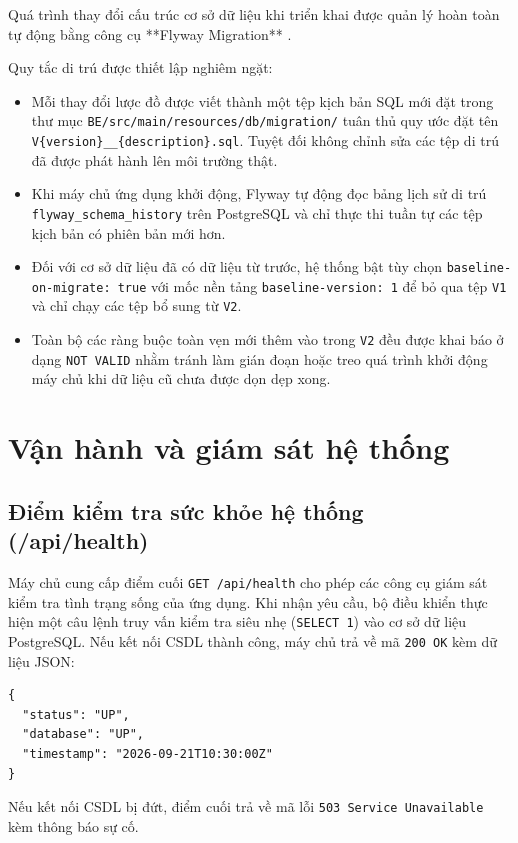 Quá trình thay đổi cấu trúc cơ sở dữ liệu khi triển khai được quản lý hoàn toàn tự động bằng công cụ **Flyway Migration** \cite{flyway_docs}. 

Quy tắc di trú được thiết lập nghiêm ngặt:
\begin{itemize}
    \item Mỗi thay đổi lược đồ được viết thành một tệp kịch bản SQL mới đặt trong thư mục \texttt{BE/src/main/resources/db/migration/} tuân thủ quy ước đặt tên \texttt{V\{version\}\_\_\{description\}.sql}. Tuyệt đối không chỉnh sửa các tệp di trú đã được phát hành lên môi trường thật.
    \item Khi máy chủ ứng dụng khởi động, Flyway tự động đọc bảng lịch sử di trú \texttt{flyway\_schema\_history} trên PostgreSQL và chỉ thực thi tuần tự các tệp kịch bản có phiên bản mới hơn.
    \item Đối với cơ sở dữ liệu đã có dữ liệu từ trước, hệ thống bật tùy chọn \texttt{baseline-on-migrate: true} với mốc nền tảng \texttt{baseline-version: 1} để bỏ qua tệp \texttt{V1} và chỉ chạy các tệp bổ sung từ \texttt{V2}.
    \item Toàn bộ các ràng buộc toàn vẹn mới thêm vào trong \texttt{V2} đều được khai báo ở dạng \texttt{NOT VALID} nhằm tránh làm gián đoạn hoặc treo quá trình khởi động máy chủ khi dữ liệu cũ chưa được dọn dẹp xong.
\end{itemize}

\section{Vận hành và giám sát hệ thống}
\label{sec:tk_vanhanh}

\subsection{Điểm kiểm tra sức khỏe hệ thống (/api/health)}
Máy chủ cung cấp điểm cuối \texttt{GET /api/health} cho phép các công cụ giám sát kiểm tra tình trạng sống của ứng dụng. Khi nhận yêu cầu, bộ điều khiển thực hiện một câu lệnh truy vấn kiểm tra siêu nhẹ (\texttt{SELECT 1}) vào cơ sở dữ liệu PostgreSQL. Nếu kết nối CSDL thành công, máy chủ trả về mã \texttt{200 OK} kèm dữ liệu JSON:
\begin{lstlisting}
{
  "status": "UP",
  "database": "UP",
  "timestamp": "2026-09-21T10:30:00Z"
}
\end{lstlisting}
Nếu kết nối CSDL bị đứt, điểm cuối trả về mã lỗi \texttt{503 Service Unavailable} kèm thông báo sự cố.

